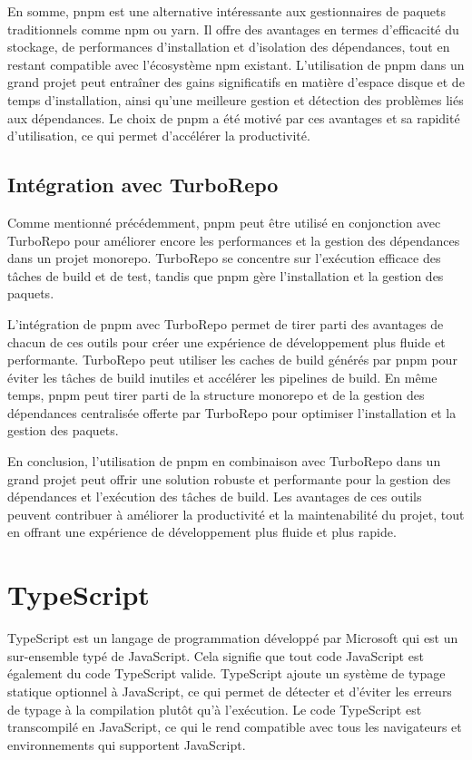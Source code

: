 En somme, pnpm est une alternative intéressante aux gestionnaires de paquets traditionnels comme npm ou yarn. Il offre des avantages en termes d'efficacité du stockage, de performances d'installation et d'isolation des dépendances, tout en restant compatible avec l'écosystème npm existant. L'utilisation de pnpm dans un grand projet peut entraîner des gains significatifs en matière d'espace disque et de temps d'installation, ainsi qu'une meilleure gestion et détection des problèmes liés aux dépendances. Le choix de pnpm a été motivé par ces avantages et sa rapidité d'utilisation, ce qui permet d'accélérer la productivité.

\subsection{Intégration avec TurboRepo}

Comme mentionné précédemment, pnpm peut être utilisé en conjonction avec TurboRepo pour améliorer encore les performances et la gestion des dépendances dans un projet monorepo. TurboRepo se concentre sur l'exécution efficace des tâches de build et de test, tandis que pnpm gère l'installation et la gestion des paquets.

L'intégration de pnpm avec TurboRepo permet de tirer parti des avantages de chacun de ces outils pour créer une expérience de développement plus fluide et performante. TurboRepo peut utiliser les caches de build générés par pnpm pour éviter les tâches de build inutiles et accélérer les pipelines de build. En même temps, pnpm peut tirer parti de la structure monorepo et de la gestion des dépendances centralisée offerte par TurboRepo pour optimiser l'installation et la gestion des paquets.

En conclusion, l'utilisation de pnpm en combinaison avec TurboRepo dans un grand projet peut offrir une solution robuste et performante pour la gestion des dépendances et l'exécution des tâches de build. Les avantages de ces outils peuvent contribuer à améliorer la productivité et la maintenabilité du projet, tout en offrant une expérience de développement plus fluide et plus rapide.


\section{TypeScript}
TypeScript est un langage de programmation développé par Microsoft qui est un sur-ensemble typé de JavaScript. Cela signifie que tout code JavaScript est également du code TypeScript valide. TypeScript ajoute un système de typage statique optionnel à JavaScript, ce qui permet de détecter et d'éviter les erreurs de typage à la compilation plutôt qu'à l'exécution. Le code TypeScript est transcompilé en JavaScript, ce qui le rend compatible avec tous les navigateurs et environnements qui supportent JavaScript.

